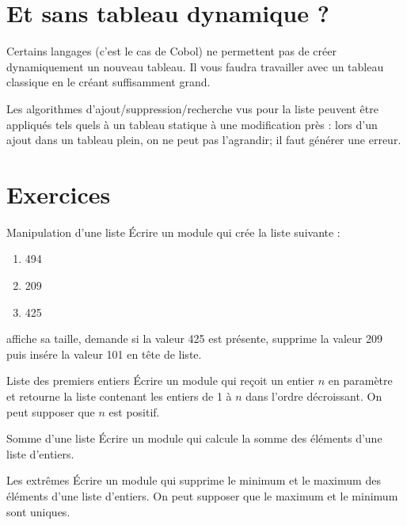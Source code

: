 	
	\section{Et sans tableau dynamique ?}
	
		Certains langages (c’est le cas de Cobol) ne permettent pas de créer
		dynamiquement un nouveau tableau. Il vous faudra travailler avec un
		tableau classique en le créant suffisamment grand.
			
		Les algorithmes d’ajout/suppression/recherche vus pour la liste peuvent
		être appliqués tels quels à un tableau statique à une modification près
		: lors d’un ajout dans un tableau plein, on ne peut pas l’agrandir; il
		faut générer une erreur.
	
	\section{Exercices}
	
		\begin{Exercice}{Manipulation d'une liste}
			Écrire un module qui crée la liste suivante :
			\begin{enumerate}[start=0]
			\item 494
			\item 209
			\item 425
			\end{enumerate}
			affiche sa taille, demande si la valeur 425 est présente, 
			supprime la valeur 209 puis insére la valeur 101 en tête de liste.
		\end{Exercice}
		
		\begin{Exercice}{Liste des premiers entiers}
			Écrire un module qui reçoit un entier $n$ en paramètre et retourne la
			liste contenant les entiers de 1 à $n$ dans l'ordre
			décroissant. On peut supposer que $n$ est positif.
		\end{Exercice}
			
		\begin{Exercice}{Somme d'une liste}
			Écrire un module qui calcule la somme des éléments d’une liste
			d’entiers.
		\end{Exercice}
		
		\begin{Exercice}{Les extrêmes}
				Écrire un module qui supprime le minimum et le maximum des éléments
				d’une liste d’entiers. On peut supposer que le maximum et le minimum
				sont uniques.
		\end{Exercice}
		
